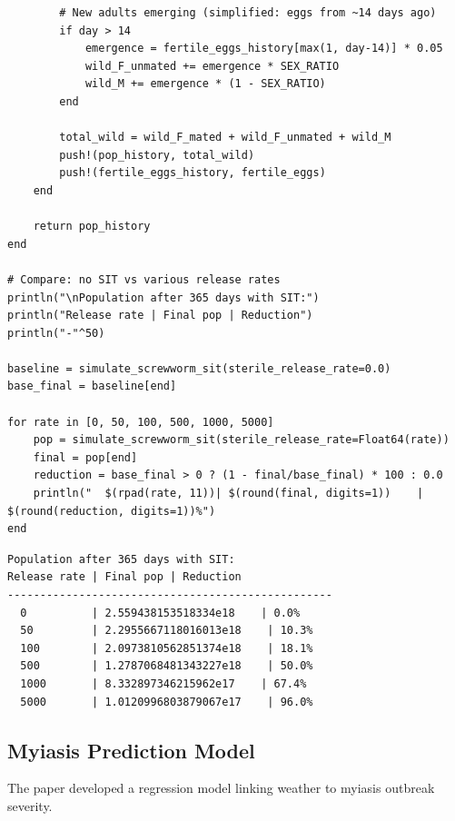 \begin{verbatim}
        # New adults emerging (simplified: eggs from ~14 days ago)
        if day > 14
            emergence = fertile_eggs_history[max(1, day-14)] * 0.05
            wild_F_unmated += emergence * SEX_RATIO
            wild_M += emergence * (1 - SEX_RATIO)
        end

        total_wild = wild_F_mated + wild_F_unmated + wild_M
        push!(pop_history, total_wild)
        push!(fertile_eggs_history, fertile_eggs)
    end

    return pop_history
end

# Compare: no SIT vs various release rates
println("\nPopulation after 365 days with SIT:")
println("Release rate | Final pop | Reduction")
println("-"^50)

baseline = simulate_screwworm_sit(sterile_release_rate=0.0)
base_final = baseline[end]

for rate in [0, 50, 100, 500, 1000, 5000]
    pop = simulate_screwworm_sit(sterile_release_rate=Float64(rate))
    final = pop[end]
    reduction = base_final > 0 ? (1 - final/base_final) * 100 : 0.0
    println("  $(rpad(rate, 11))| $(round(final, digits=1))    | $(round(reduction, digits=1))%")
end
\end{verbatim}




\begin{verbatim}
Population after 365 days with SIT:
Release rate | Final pop | Reduction
--------------------------------------------------
  0          | 2.559438153518334e18    | 0.0%
  50         | 2.2955667118016013e18    | 10.3%
  100        | 2.0973810562851374e18    | 18.1%
  500        | 1.2787068481343227e18    | 50.0%
  1000       | 8.332897346215962e17    | 67.4%
  5000       | 1.0120996803879067e17    | 96.0%
\end{verbatim}



\subsection{Myiasis Prediction Model}



\label{11238384801155022474}{}


The paper developed a regression model linking weather to myiasis outbreak severity.




